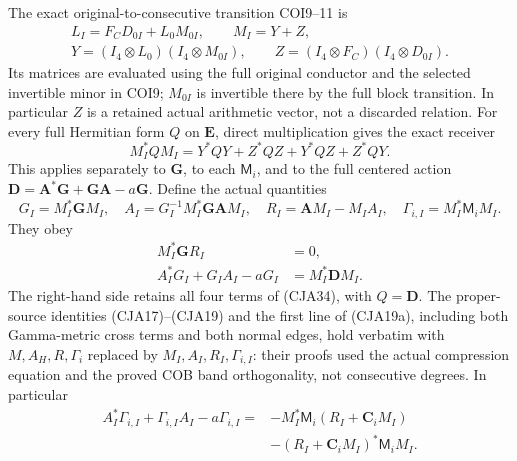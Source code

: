\documentclass[11pt,a4paper]{article}
\begin{document}
The exact original-to-consecutive transition COI9--11 is
\begin{equation}
 \begin{gathered}
 L_I=F_CD_{0I}+L_0M_{0I},\qquad M_I=Y+Z,\\
 Y=(I_4\otimes L_0)(I_4\otimes M_{0I}),\qquad
 Z=(I_4\otimes F_C)(I_4\otimes D_{0I}).
 \end{gathered}
 \tag{CJA33}
\end{equation}
Its matrices are evaluated using the full original conductor and
the selected invertible minor in COI9; \(M_{0I}\) is invertible
there by the full block transition.
In particular \(Z\) is a retained actual arithmetic vector, not
a discarded relation.
For every full Hermitian form \(Q\) on \(\mathbf E\), direct
multiplication gives the exact receiver
\begin{equation}
 M_I^*QM_I=Y^*QY+Z^*QZ+Y^*QZ+Z^*QY .
 \tag{CJA34}
\end{equation}
This applies separately to \(\mathbf G\), to each \(\mathsf M_i\),
and to the full centered action
\(\mathbf D=\mathbf A^*\mathbf G+\mathbf G\mathbf A-a\mathbf G\).
Define the actual quantities
\[
 G_I=M_I^*\mathbf GM_I,\quad
 A_I=G_I^{-1}M_I^*\mathbf G\mathbf AM_I,\quad
 R_I=\mathbf AM_I-M_IA_I,\quad
 \Gamma_{i,I}=M_I^*\mathsf M_iM_I.
 \]
They obey
\begin{equation}
 \begin{split}
 M_I^*\mathbf GR_I&=0,\\
 A_I^*G_I+G_IA_I-aG_I&=M_I^*\mathbf DM_I .
 \end{split}
 \tag{CJA35}
\end{equation}
The right-hand side retains all four terms of (CJA34), with
\(Q=\mathbf D\).
The proper-source identities (CJA17)--(CJA19) and the first line
of (CJA19a), including both
Gamma-metric cross terms and both normal edges, hold verbatim
with \(M,A_H,R,\Gamma_i\) replaced by
\(M_I,A_I,R_I,\Gamma_{i,I}\): their proofs used the actual
compression equation and the proved COB band orthogonality,
not consecutive degrees.
In particular
\[
 \begin{split}
 A_I^*\Gamma_{i,I}+\Gamma_{i,I}A_I-a\Gamma_{i,I}
 ={}&-M_I^*\mathsf M_i(R_I+\boldsymbol C_iM_I)\\
    &-(R_I+\boldsymbol C_iM_I)^*\mathsf M_iM_I .
 \end{split}
 \]
\end{document}
